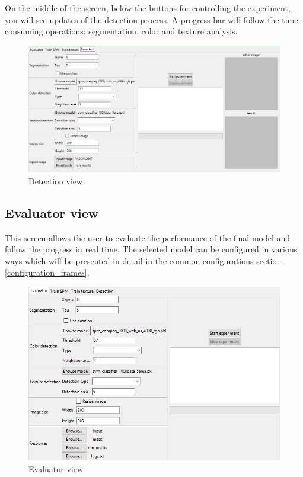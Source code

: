 \documentclass[12pt]{report}
\begin{document}
	On the middle of the screen, below the buttons for controlling the experiment, you will see updates of the detection process. A progress bar will follow the time consuming operations: segmentation, color and texture analysis.
	
	\begin{figure}[h!]
		\centering
		\includegraphics[width=\linewidth]{manual/detection_view.png}
		\caption{Detection view}
	\end{figure}
	
	\subsection{Evaluator view}
	
	This screen allows the user to evaluate the performance of the final model and follow the progress in real time. The selected model can be configured in various ways which will be presented in detail in the common configurations section \ref{configuration_frames}.
	
	\begin{figure}[h!]
		\centering
		\includegraphics[width=\linewidth]{manual/evaluator_view.png}
		\caption{Evaluator view}
	\end{figure}
	
\end{document}
